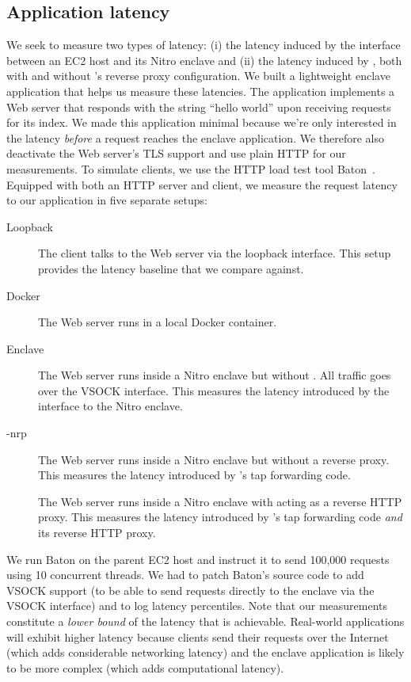 \subsection{Application latency}%
\label{sec:latency}

We seek to measure two types of latency: (i) the latency induced by the
interface between an EC2 host and its Nitro enclave and (ii) the latency induced
by \tool{}, both with and without \tool{}'s reverse proxy configuration.  We
built a lightweight enclave application that helps us measure these latencies.
The application implements a Web server that responds with the string ``hello
world'' upon receiving requests for its index.  We made this application minimal
because we're only interested in the latency \emph{before} a request reaches the
enclave application.  We therefore also deactivate the Web server's TLS support
and use plain HTTP for our measurements.  To simulate clients, we use the HTTP
load test tool Baton~\cite{baton}.  Equipped with both an HTTP server and
client, we measure the request latency to our application in five separate
setups:

\begin{description}
  \item[Loopback] The client talks to the Web server via the loopback interface.
    This setup provides the latency baseline that we compare against.

  \item[Docker] The Web server runs in a local Docker container.

  \item[Enclave] The Web server runs inside a Nitro enclave but without \tool{}.
    All traffic goes over the VSOCK interface.  This measures the latency
    introduced by the interface to the Nitro enclave.

  \item[\Tool{}-nrp] The Web server runs inside a Nitro enclave but without a
    reverse proxy.  This measures the latency introduced by \tool{}'s tap
    forwarding code.

  \item[\Tool{}] The Web server runs inside a Nitro enclave with \tool{} acting
    as a reverse HTTP proxy.  This measures the latency introduced by \tool{}'s
    tap forwarding code \emph{and} its reverse HTTP proxy.
\end{description}

We run
Baton on the parent EC2 host and instruct it to send 100,000 requests using 10
concurrent threads.  We had to patch Baton's source code to add VSOCK support
(to be able to send requests directly to the enclave via the VSOCK interface)
and to log latency percentiles.  Note that our measurements constitute a
\emph{lower bound} of the latency that is achievable.  Real-world applications
will exhibit higher latency because clients send their requests over the
Internet (which adds considerable networking latency) and the enclave
application is likely to be more complex (which adds computational latency).

